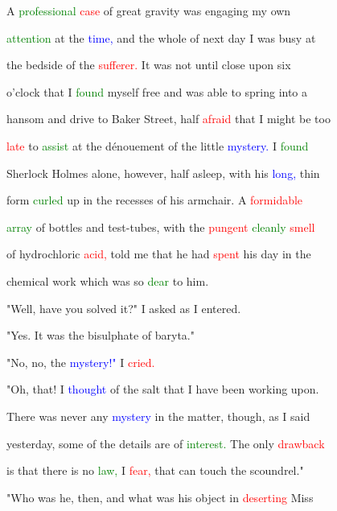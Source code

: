  A \textcolor{green}{professional} \textcolor{red}{case} of great gravity was engaging my own

 \textcolor{green}{attention} at the \textcolor{blue}{time,} and the whole of next day I was busy at

 the bedside of the \textcolor{red}{sufferer.} It was not until close upon six

 o'clock that I \textcolor{green}{found} myself free and was able to spring into a

 hansom and drive to Baker Street, half \textcolor{red}{afraid} that I might be too

 \textcolor{red}{late} to \textcolor{green}{assist} at the dénouement of the little \textcolor{blue}{mystery.} I \textcolor{green}{found}

 Sherlock Holmes alone, however, half asleep, with his \textcolor{blue}{long,} thin

 form \textcolor{green}{curled} up in the recesses of his armchair. A \textcolor{red}{formidable}

 \textcolor{green}{array} of bottles and test-tubes, with the \textcolor{red}{pungent} \textcolor{green}{cleanly} \textcolor{red}{smell}

 of hydrochloric \textcolor{red}{acid,} told me that he had \textcolor{red}{spent} his day in the

 chemical work which was so \textcolor{green}{dear} to him.



 "Well, have you solved it?" I asked as I entered.



 "Yes. It was the bisulphate of baryta."



 "No, no, the \textcolor{blue}{mystery!"} I \textcolor{red}{cried.}



 "Oh, that! I \textcolor{blue}{thought} of the salt that I have been working upon.

 There was never any \textcolor{blue}{mystery} in the matter, though, as I said

 yesterday, some of the details are of \textcolor{green}{interest.} The only \textcolor{red}{drawback}

 is that there is no \textcolor{green}{law,} I \textcolor{red}{fear,} that can touch the \textcolor{BurntOrange}{scoundrel."}



 "Who was he, then, and what was his object in \textcolor{red}{deserting} Miss

